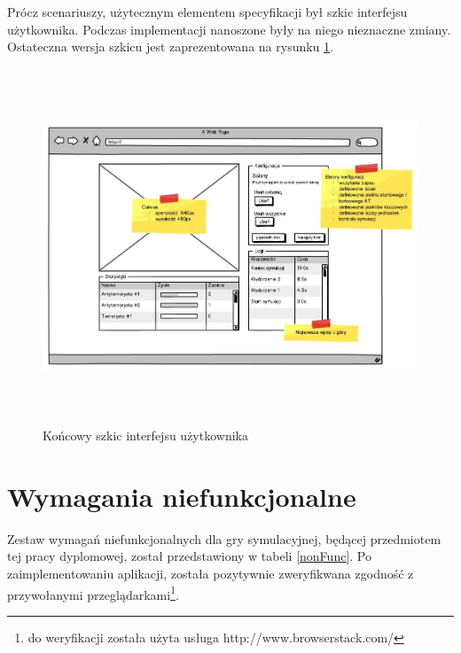 Prócz scenariuszy, użytecznym elementem specyfikacji był szkic interfejsu użytkownika. Podczas implementacji nanoszone były na niego nieznaczne zmiany. Ostateczna wersja szkicu jest zaprezentowana na rysunku \ref{wireframe}.

\begin{figure}
\begin{center}
	\includegraphics[width=160mm,height=106mm]{images/wireframe}
	\caption{Końcowy szkic interfejsu użytkownika\label{wireframe}}
\end{center}
\end{figure}

\section{Wymagania niefunkcjonalne}
Zestaw wymagań niefunkcjonalnych dla gry symulacyjnej, będącej przedmiotem tej pracy dyplomowej, został przedstawiony w tabeli \ref{nonFunc}. Po zaimplementowaniu aplikacji, została pozytywnie zweryfikwana zgodność z przywołanymi przeglądarkami\footnote{do weryfikacji została użyta usługa http://www.browserstack.com/}.

